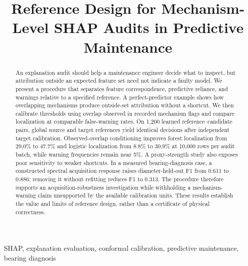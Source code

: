 \documentclass[conference]{IEEEtran}
\begin{document}
\title{Reference Design for Mechanism-Level SHAP Audits in Predictive Maintenance}
\author{
}
\maketitle
\begin{abstract}
An explanation audit should help a maintenance engineer decide what to inspect, but attribution outside an expected feature set need not indicate a faulty model. We present a procedure that separates feature correspondence, predictive reliance, and warnings relative to a specified reference. A perfect-predictor example shows how overlapping mechanisms produce outside-set attribution without a shortcut. We then calibrate thresholds using overlap observed in recorded mechanism flags and compare localization at comparable false-warning rates. On 1,200 learned reference--candidate pairs, global source and target references yield identical decisions after independent target calibration. Observed-overlap conditioning improves forest localization from 29.0\% to 47.7\% and logistic localization from 8.8\% to 30.9\% at 10,000 rows per audit batch, while warning frequencies remain near 5\%. A proxy-strength study also exposes poor sensitivity to weaker shortcuts. In a measured bearing-diagnosis case, a constructed spectral acquisition response raises diameter-held-out F1 from 0.611 to 0.886; removing it without refitting reduces F1 to 0.313. The procedure therefore supports an acquisition-robustness investigation while withholding a mechanism-warning claim unsupported by the available calibration units. These results establish the value and limits of reference design, rather than a certificate of physical correctness.
\end{abstract}
\begin{IEEEkeywords}
SHAP, explanation evaluation, conformal calibration, predictive maintenance, bearing diagnosis
\end{IEEEkeywords}
\end{document}
